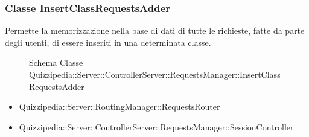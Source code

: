 \subsubsection{Classe InsertClassRequestsAdder}
Permette la memorizzazione nella base di dati di tutte le richieste, fatte da parte degli utenti, di essere inseriti in una determinata classe.
\begin{figure}[H]
\centering
\noindent{}
\caption[Schema Classe InsertClassRequestsAdder]{Schema Classe Quizzipedia::Server::ControllerServer::RequestsManager::InsertClassRequestsAdder}
\end{figure}
\begin{itemize}
\item Quizzipedia::Server::RoutingManager::RequestsRouter
\end{itemize}
\begin{itemize}
\item Quizzipedia::Server::ControllerServer::RequestsManager::SessionController
\end{itemize}
